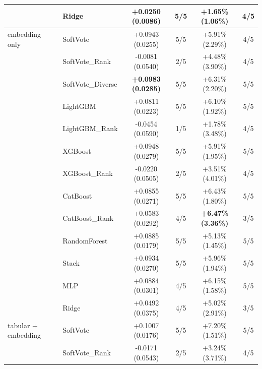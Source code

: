 \documentclass[10pt,journal,compsoc]{IEEEtran}
\begin{document}
\begin{table}[tbp]
\begin{tabular}{llcccc}
                       & Ridge              & +0.0250 (0.0086)                 & 5/5 & +1.65\% (1.06\%)                 & 4/5 \\
\midrule
embedding only         & SoftVote           & +0.0943 (0.0255)                 & 5/5 & +5.91\% (2.29\%)                 & 4/5 \\
                       & SoftVote\_Rank     & -0.0081 (0.0540)                 & 2/5 & +4.48\% (3.90\%)                 & 4/5 \\
                       & SoftVote\_Diverse  & \textbf{+0.0983 (0.0285)}        & 5/5 & +6.31\% (2.20\%)                 & 5/5 \\
                       & LightGBM           & +0.0811 (0.0223)                 & 5/5 & +6.10\% (1.92\%)                 & 5/5 \\
                       & LightGBM\_Rank     & -0.0454 (0.0590)                 & 1/5 & +1.78\% (3.48\%)                 & 4/5 \\
                       & XGBoost            & +0.0948 (0.0279)                 & 5/5 & +5.91\% (1.95\%)                 & 5/5 \\
                       & XGBoost\_Rank      & -0.0220 (0.0505)                 & 2/5 & +3.51\% (4.01\%)                 & 4/5 \\
                       & CatBoost           & +0.0855 (0.0271)                 & 5/5 & +6.43\% (1.80\%)                 & 5/5 \\
                       & CatBoost\_Rank     & +0.0583 (0.0292)                 & 4/5 & \textbf{+6.47\% (3.36\%)}        & 3/5 \\
                       & RandomForest       & +0.0885 (0.0179)                 & 5/5 & +5.13\% (1.45\%)                 & 5/5 \\
                       & Stack              & +0.0934 (0.0270)                 & 5/5 & +5.96\% (1.94\%)                 & 5/5 \\
                       & MLP                & +0.0884 (0.0301)                 & 4/5 & +6.15\% (1.58\%)                 & 5/5 \\
                       & Ridge              & +0.0492 (0.0375)                 & 4/5 & +5.02\% (2.91\%)                 & 3/5 \\
\midrule
tabular + embedding    & SoftVote           & +0.1007 (0.0176)                 & 5/5 & +7.20\% (1.51\%)                 & 5/5 \\
                       & SoftVote\_Rank     & -0.0171 (0.0543)                 & 2/5 & +3.24\% (3.71\%)                 & 4/5 \\

\end{tabular}
\end{table}
\end{document}
